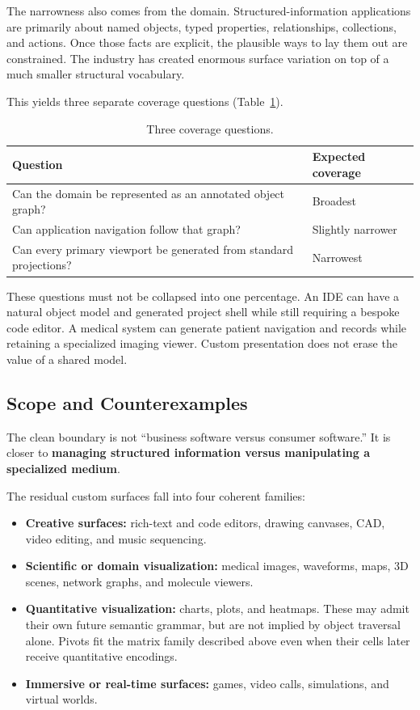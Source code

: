 \documentclass[sigplan,review,anonymous,10pt]{acmart}
\begin{document}
The narrowness also comes from the domain. Structured-information applications are primarily about named objects, typed properties, relationships, collections, and actions. Once those facts are explicit, the plausible ways to lay them out are constrained. The industry has created enormous surface variation on top of a much smaller structural vocabulary.

This yields three separate coverage questions (Table~\ref{tab:coverage}).

\begin{table}[h]
\centering
\begin{tabular}{p{} p{}}
\hline
Question & Expected coverage \\
\hline
Can the domain be represented as an annotated object graph? & Broadest \\
Can application navigation follow that graph? & Slightly narrower \\
Can every primary viewport be generated from standard projections? & Narrowest \\
\hline
\end{tabular}
\caption{Three coverage questions.}
\label{tab:coverage}
\end{table}

These questions must not be collapsed into one percentage. An IDE can have a natural object model and generated project shell while still requiring a bespoke code editor. A medical system can generate patient navigation and records while retaining a specialized imaging viewer. Custom presentation does not erase the value of a shared model.

\subsection*{Scope and Counterexamples}

The clean boundary is not ``business software versus consumer software.'' It is closer to \textbf{managing structured information versus manipulating a specialized medium}.

The residual custom surfaces fall into four coherent families:

\begin{itemize}
\item \textbf{Creative surfaces:} rich-text and code editors, drawing canvases, CAD, video editing, and music sequencing.
\item \textbf{Scientific or domain visualization:} medical images, waveforms, maps, 3D scenes, network graphs, and molecule viewers.
\item \textbf{Quantitative visualization:} charts, plots, and heatmaps. These may admit their own future semantic grammar, but are not implied by object traversal alone. Pivots fit the matrix family described above even when their cells later receive quantitative encodings.
\item \textbf{Immersive or real-time surfaces:} games, video calls, simulations, and virtual worlds.
\end{itemize}
\end{document}
